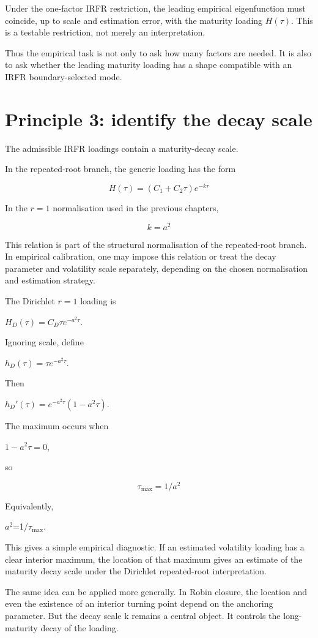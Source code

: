 \documentclass[11pt,oneside]{book}
\begin{document}
Under the one-factor IRFR restriction, the leading empirical
eigenfunction must coincide, up to scale and estimation error, with the
maturity loading $H(\tau)$. This is a testable restriction, not merely an
interpretation.

Thus the empirical task is not only to ask how many factors are needed.
It is also to ask whether the leading maturity loading has a shape
compatible with an IRFR boundary-selected mode.

\section{Principle 3: identify the decay
scale}\label{principle-3-identify-the-decay-scale}

The admissible IRFR loadings contain a maturity-decay scale.

In the repeated-root branch, the generic loading has the form

\[
H(\tau)=(C_1+C_2\tau)e^{-k\tau}
\]

In the $r=1$ normalisation used in the previous chapters,

\[
k=a^2
\]

This relation is part of the structural normalisation of the
repeated-root branch. In empirical calibration, one may impose this
relation or treat the decay parameter and volatility scale separately,
depending on the chosen normalisation and estimation strategy.

The Dirichlet $r=1$ loading is

$H_D(\tau)=C_D\tau e^{-a^2\tau}$.

Ignoring scale, define

$h_D(\tau)=\tau e^{-a^2\tau}$.

Then

$h_D'(\tau)=e^{-a^2\tau}(1-a^2\tau)$.

The maximum occurs when

$1-a^2\tau=0$,

so

\[
\tau_{\max}=1/a^2
\]

Equivalently,

$a^2$=1/$\tau_{\max}$.

This gives a simple empirical diagnostic. If an estimated volatility
loading has a clear interior maximum, the location of that maximum gives
an estimate of the maturity decay scale under the Dirichlet
repeated-root interpretation.

The same idea can be applied more generally. In Robin closure, the
location and even the existence of an interior turning point depend on
the anchoring parameter. But the decay scale k remains a central object.
It controls the long-maturity decay of the loading.
\end{document}
